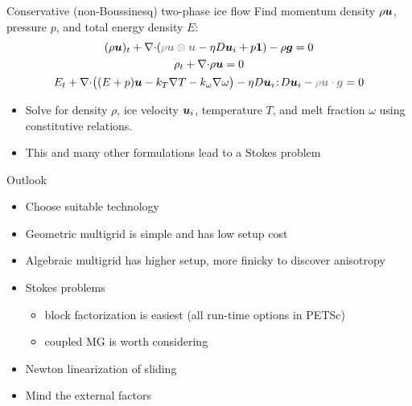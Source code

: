 \documentclass{beamer}
\begin{document}


\newcommand\smallterm[1]{{\color{gray} #1}}
\begin{frame}{Conservative (non-Boussinesq) two-phase ice flow}
  Find momentum density $\rho\bm u$, pressure $p$, and total energy density $E$:
  \begin{gather*}
    (\rho\uu)_t + \div (\smallterm{\rho\uu\otimes\uu} - \eta D\uu_i + p\bm 1) - \rho \bm g = 0 \\
    \rho_t + \div \rho\uu = 0 \\
    E_t + \div \big((E+p)\uu - k_T\nabla T - k_\omega\nabla\omega \big) - \eta D\uu_i\tcolon D\uu_i - \smallterm{\rho\uu\cdot\bm g} = 0
  \end{gather*}
\begin{itemize}
\item Solve for density $\rho$, ice velocity $\bm u_i$, temperature $T$, and melt fraction $\omega$ using constitutive relations.
\item This and many other formulations lead to a Stokes problem
\end{itemize}
\end{frame}






\begin{frame}{Outlook}
  \begin{itemize}
  \item Choose suitable technology
  \item Geometric multigrid is simple and has low setup cost
  \item Algebraic multigrid has higher setup, more finicky to discover anisotropy
  \item Stokes problems
    \begin{itemize}
    \item block factorization is easiest (all run-time options in PETSc)
    \item coupled MG is worth considering
    \end{itemize}
  \item Newton linearization of sliding
  \item Mind the external factors
  \end{itemize}
\end{frame}
\end{document}

